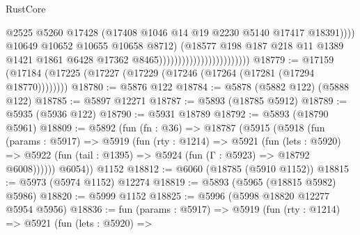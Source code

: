 \begin{lexlean}{RustCore}
\begin{coremodule}
                                                          @2525
                                                          @5260
                                                          @17428
                                                          (@17408
                                                            @1046
                                                            @14
                                                            @19
                                                            @2230
                                                            @5140
                                                            @17417
                                                            @18391))))
                                                    @10649
                                                    @10652
                                                    @10655
                                                    @10658
                                                    @8712)
                                                  (@18577
                                                    @198
                                                    @187
                                                    @218
                                                    @11
                                                    @1389
                                                    @1421
                                                    @1861
                                                    @6428
                                                    @17362
                                                    @8465))))))))))))))))))))))))
@18779 := @17159 (@17184 (@17225 (@17227 (@17229 (@17246 (@17264 (@17281 (@17294 @18770))))))))
@18780 := @5876 @122
@18784 := @5878 (@5882 @122) (@5888 @122)
@18785 := @5897 @12271
@18787 := @5893 (@18785 @5912)
@18789 := @5935 (@5936 @122)
@18790 := @5931 @18789
@18792 := @5893 (@18790 @5961)
@18809 := @5892
    (fun (fn : @36) =>
    @18787
      (@5915
        (@5918
          (fun (params : @5917) =>
          @5919
            (fun (rty : @1214) =>
            @5921
              (fun (lets : @5920) =>
              @5922 (fun (tail : @1395) => @5924 (fun (Γ : @5923) => @18792 @6008))))))
        @6054))
    @1152
@18812 := @6060 (@18785 (@5910 @1152))
@18815 := @5973 (@5974 @1152) @12274
@18819 := @5893 (@5965 (@18815 @5982) @5986)
@18820 := @5999 @1152
@18825 := @5996 (@5998 @18820 @12277 @5954 @5956)
@18836 := fun (params : @5917) =>
  @5919
    (fun (rty : @1214) =>
    @5921
      (fun (lets : @5920) =>

\end{coremodule}
\end{lexlean}
